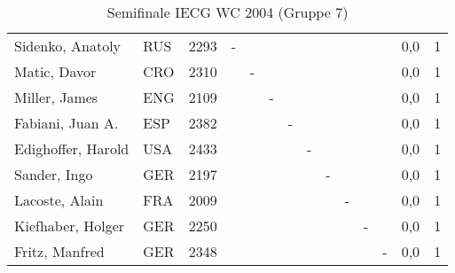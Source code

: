 \documentclass[german,twocolumn,a4paper,twoside,10pt]{article}
\begin{document}
\begin{table*}[htbp]
  \centering
  \begin{tabular}{|llr|ccccccccc|c|c|}
\hline
Sidenko, Anatoly & RUS & 2293   & - & & & & & & & & & 0,0 & 1 \\ 
Matic, Davor & CRO & 2310       & & - & & & & & & & & 0,0 & 1 \\
Miller, James & ENG & 2109      & & & - & & & & & & & 0,0 & 1 \\
Fabiani, Juan A. & ESP & 2382   & & & & - & & & & & & 0,0 & 1 \\
Edighoffer, Harold & USA & 2433 & & & & & - & & & & & 0,0 & 1 \\
Sander, Ingo & GER & 2197       & & & & & & - & & & & 0,0 & 1 \\
Lacoste, Alain & FRA & 2009     & & & & & & & - & & & 0,0 & 1 \\
Kiefhaber, Holger & GER & 2250  & & & & & & & & - & & 0,0 & 1 \\
Fritz, Manfred & GER & 2348     & & & & & & & & & - & 0,0 & 1 \\
\hline
  \end{tabular}
  \caption{Semifinale IECG WC 2004 (Gruppe 7)}
  \label{tab:ResultatWC2004}
\end{table*}
\end{document}
